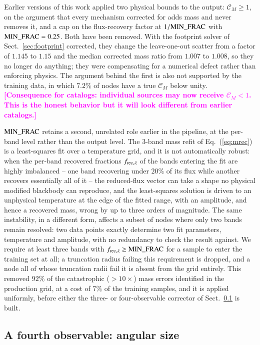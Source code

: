 \documentclass{aa}
\newcommand{\draftnote}[1]{\textcolor{magenta}{\textbf{[#1]}}}
\newcommand{\CM}{\mathcal{C}_{M}}
\begin{document}
Earlier versions of this work applied two physical bounds to the output:
$\CM\ge1$, on the argument that every mechanism corrected for adds mass and
never removes it, and a cap on the flux-recovery factor at
$1/{\rm MIN\_FRAC}$ with ${\rm MIN\_FRAC}=0.25$. Both have been
removed. With the footprint solver of Sect.~\ref{sec:footprint} corrected,
they change the leave-one-out scatter from a factor of $1.145$ to $1.15$ and
the median corrected mass ratio from $1.007$ to $1.008$, so they no longer
do anything; they were compensating for a numerical defect rather than
enforcing physics. The argument behind the first is also not supported by
the training data, in which $7.2\%$ of nodes have a true $\CM$ below unity.
\draftnote{Consequence for catalogs: individual sources may now receive $\CM<1$.
This is the honest behavior but it will look different from earlier
catalogs.}

${\rm MIN\_FRAC}$ retains a second, unrelated role earlier in the
pipeline, at the per-band level rather than the output level. The 3-band
mass refit of Eq.~(\ref{eq:mrec}) is a least-squares fit over a temperature
grid, and it is not automatically robust: when the per-band recovered
fractions $f_{{{\rm rec}},\lambda}$ of the bands entering the fit are highly
imbalanced -- one band recovering under $20\%$ of its flux while another
recovers essentially all of it -- the reduced-flux vector can take a shape
no physical modified blackbody can reproduce, and the least-squares solution
is driven to an unphysical temperature at the edge of the fitted range, with
an amplitude, and hence a recovered mass, wrong by up to three orders of
magnitude. The same instability, in a different form, affects a subset of
nodes where only two bands remain resolved: two data points exactly
determine two fit parameters, temperature and amplitude, with no redundancy
to check the result against. We require at least three bands with
$f_{{{\rm rec}},\lambda}\ge{\rm MIN\_FRAC}$ for a sample to enter the
training set at all; a truncation radius failing this requirement is
dropped, and a node all of whose truncation radii fail it is absent from the
grid entirely. This removed $92\%$ of the catastrophic ($>\!10\times$) mass
errors identified in the production grid, at a cost of $7\%$ of the training
samples, and it is applied uniformly, before either the three- or
four-observable corrector of Sect.~\ref{sec:fourthobs} is built.

\subsection{A fourth observable: angular size}
\label{sec:fourthobs}
\end{document}
